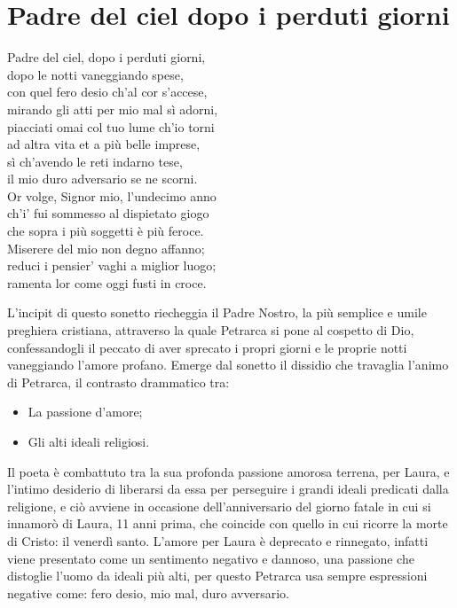 \documentclass[10pt,a4paper]{article}
\begin{document}
\section{Padre del ciel dopo i perduti giorni}

\begin{estratto}
	Padre del ciel, dopo i perduti giorni,\\
	dopo le notti vaneggiando spese,\\
	con quel fero desio ch’al cor s’accese,\\
	mirando gli atti per mio mal sì adorni,\\
	
	 piacciati omai col tuo lume ch’io torni\\
	ad altra vita et a più belle imprese,\\
	sì ch’avendo le reti indarno tese,\\
	il mio duro adversario se ne scorni.\\
	
	Or volge, Signor mio, l’undecimo anno\\
	ch’i’ fui sommesso al dispietato giogo\\
	che sopra i più soggetti è più feroce.\\
	
	Miserere  del mio non degno affanno;\\
	reduci i pensier’ vaghi a miglior luogo;\\
	ramenta lor come oggi fusti in croce.\\
\end{estratto}

L’incipit di questo sonetto riecheggia il Padre Nostro, la più semplice e umile preghiera cristiana, attraverso la quale Petrarca si pone al cospetto di Dio, confessandogli il peccato di aver sprecato i propri giorni e le proprie notti vaneggiando l’amore profano.
Emerge dal sonetto il dissidio che travaglia l’animo di Petrarca, il contrasto drammatico tra:
\begin{itemize}
	\item La passione d’amore;
	\item Gli alti ideali religiosi.
\end{itemize}

Il poeta è combattuto tra la sua profonda passione amorosa terrena, per Laura, e l’intimo desiderio di liberarsi da essa per perseguire i grandi ideali predicati dalla religione, e ciò avviene in occasione dell’anniversario del giorno fatale in cui si innamorò di Laura, 11 anni prima, che coincide con quello in cui ricorre la morte di Cristo: il venerdì santo.
L’amore per Laura è deprecato e rinnegato, infatti viene presentato come un sentimento negativo e dannoso, una passione che distoglie l’uomo da ideali più alti, per questo Petrarca usa sempre espressioni negative come: fero desio, mio mal, duro avversario.
\end{document}
